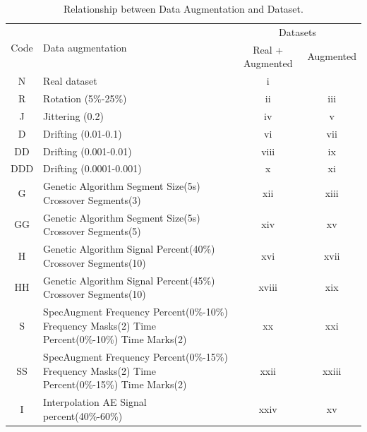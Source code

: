 \documentclass[journal]{IEEEtran}
\begin{document}
\begin{table}
\caption{Relationship between Data Augmentation and Dataset.}
\centering
\begin{tabular}{clcc}
\hline\hline %
  \multirow{2}{*}{Code} & \multirow{2}{*}{Data augmentation} & \multicolumn{2}{c}{ Datasets } \\
  \cline{3-4} %
 &  & 
  Real + Augmented
   & 
  Augmented
   \\
\hline %
N & Real dataset & i & ~ \\
R & Rotation (5\%-25\%) & ii & iii \\
J & Jittering (0.2) & iv & v \\
D & Drifting (0.01-0.1) & vi & vii \\
DD & Drifting (0.001-0.01) & viii & ix \\
DDD & Drifting (0.0001-0.001) & x & xi \\
G & Genetic Algorithm Segment Size(5s) Crossover Segments(3) & xii & xiii \\
GG & Genetic Algorithm Segment Size(5s) Crossover Segments(5) & xiv & xv \\
H & Genetic Algorithm Signal Percent(40\%) Crossover Segments(10) & xvi & xvii \\
HH & Genetic Algorithm Signal Percent(45\%) Crossover Segments(10) & xviii & xix \\
S & SpecAugment Frequency Percent(0\%-10\%) Frequency Masks(2) Time Percent(0\%-10\%) Time Marks(2) & xx & xxi \\
SS & SpecAugment Frequency Percent(0\%-15\%) Frequency Masks(2) Time Percent(0\%-15\%) Time Marks(2) & xxii & xxiii \\
I & Interpolation AE Signal percent(40\%-60\%) & xxiv & xv \\
\hline %
\end{tabular}
\label{table:code_dataset}
\end{table}
\end{document}

